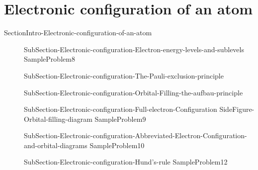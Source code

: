 \documentclass[main.tex]{subfiles}
\newcommand\chapterlabel{Ch-radiation}\setcounter{figurenewcounter}{0}\setcounter{tablenewcounter}{0}\setcounter{formulanewcounter}{0}
\begin{document}
\section{Electronic configuration of an atom}{SectionIntro-Electronic-configuration-of-an-atom}
\sloppy
\begin{description}
\item[] {SubSection-Electronic-configuration-Electron-energy-levels-and-sublevels}
  {SampleProblem8}
\item[] {SubSection-Electronic-configuration-The-Pauli-exclusion-principle}
     \label{Fig:{\chapterlabel}\thefigurenewcounter} 

\item[]{SubSection-Electronic-configuration-Orbital-Filling-the-aufbau-principle}


 \item[] {SubSection-Electronic-configuration-Full-electron-Configuration}
 {SideFigure-Orbital-filling-diagram}
  {SampleProblem9}

\item[] 
{SubSection-Electronic-configuration-Abbreviated-Electron-Configuration-and-orbital-diagrams}
  {SampleProblem10}
  \item[] {SubSection-Electronic-configuration-Hund's-rule}
{SampleProblem12}
\end{description}
\newpage
\end{document}
